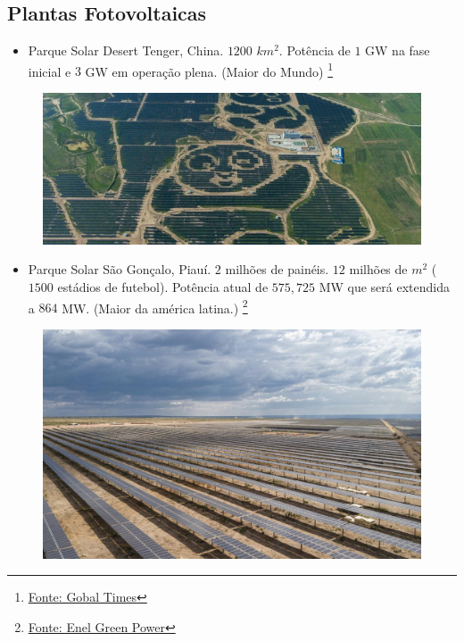 \documentclass[12pt,notheorems,hyperref={pdfauthor= Rafael Nardi}]{beamer}
\begin{document}
\subsection{Plantas Fotovoltaicas}

\begin{frame}%

	\begin{itemize}
		\item Parque Solar Desert Tenger, China. $1200$ $km^2$. Potência de $1$ GW na fase inicial e $3$
			GW em operação plena. (Maior do Mundo) \footnote{ \href{https://www.globaltimes.cn/page/202209/1275050.shtml}{Fonte: Gobal Times}}
	\end{itemize}

	\begin{figure}
		\centering
		\includegraphics[scale=0.45]{./92336_parquesolardeserttenger.jpg}
	\end{figure}

\end{frame}

\begin{frame}%

	\begin{itemize}
		\item Parque Solar São Gonçalo, Piauí. $2$ milhões de painéis. $12$ milhões de
	$m^2$ ($1500$ estádios de futebol). Potência atual de $575,725$ MW que será
	extendida a $864$ MW. (Maior da américa latina.) \footnote{ \href{https://www.enelgreenpower.com/pt/nossos-projetos/highlights/parque-solar-sao-goncalo}{Fonte: Enel Green Power}}
	\end{itemize}

	\begin{figure}
		\centering
		\includegraphics[scale=0.38]{./parco-solare-sao-goncalo_1584x960.jpg}
	\end{figure}

\end{frame}
\end{document}
